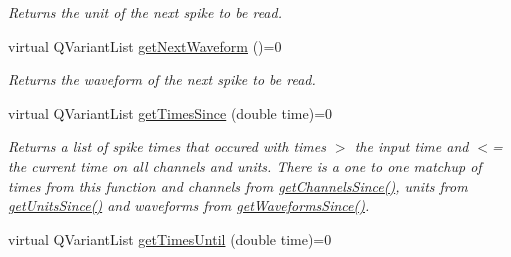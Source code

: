 \begin{DoxyCompactItemize}
\begin{DoxyCompactList}\small\item\em Returns the unit of the next spike to be read. \end{DoxyCompactList}\item 
\hypertarget{class_picto_1_1_spike_reader_ac333e206d74c77f54d660928a1309914}{virtual Q\-Variant\-List \hyperlink{class_picto_1_1_spike_reader_ac333e206d74c77f54d660928a1309914}{get\-Next\-Waveform} ()=0}\label{class_picto_1_1_spike_reader_ac333e206d74c77f54d660928a1309914}

\begin{DoxyCompactList}\small\item\em Returns the waveform of the next spike to be read. \end{DoxyCompactList}\item 
\hypertarget{class_picto_1_1_spike_reader_a7c4b527d541cd2dd9f5b50aed54a000c}{virtual Q\-Variant\-List \hyperlink{class_picto_1_1_spike_reader_a7c4b527d541cd2dd9f5b50aed54a000c}{get\-Times\-Since} (double time)=0}\label{class_picto_1_1_spike_reader_a7c4b527d541cd2dd9f5b50aed54a000c}

\begin{DoxyCompactList}\small\item\em Returns a list of spike times that occured with times $>$ the input time and $<$= the current time on all channels and units. There is a one to one matchup of times from this function and channels from \hyperlink{class_picto_1_1_spike_reader_a24a5b0c59b6285c35932bb0f06ddb23c}{get\-Channels\-Since()}, units from \hyperlink{class_picto_1_1_spike_reader_ab09fef03ca5abab5b661fc0a2f4c5ed9}{get\-Units\-Since()} and waveforms from \hyperlink{class_picto_1_1_spike_reader_a881564caff97cd2949847779de89b5ca}{get\-Waveforms\-Since()}. \end{DoxyCompactList}\item 
\hypertarget{class_picto_1_1_spike_reader_a23634600fe4ee36cf5efe834f0c3823b}{virtual Q\-Variant\-List \hyperlink{class_picto_1_1_spike_reader_a23634600fe4ee36cf5efe834f0c3823b}{get\-Times\-Until} (double time)=0}\label{class_picto_1_1_spike_reader_a23634600fe4ee36cf5efe834f0c3823b}


\end{DoxyCompactItemize}
